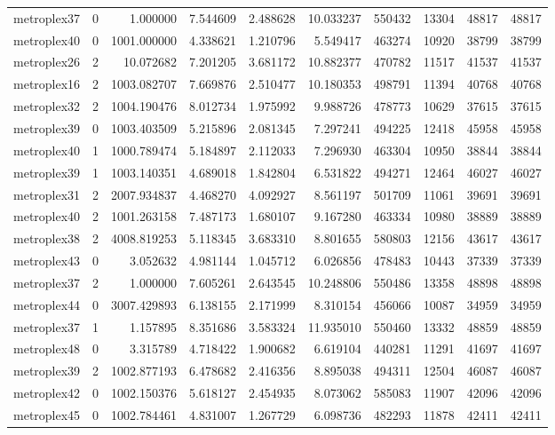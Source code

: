\begin{longtable}{|l|r|r|r|r|r|r|r|r|r|}
metroplex37 & 0 & 1.000000 & 7.544609 & 2.488628 & 10.033237 & 550432 & 13304 & 48817 & 48817 \\
metroplex40 & 0 & 1001.000000 & 4.338621 & 1.210796 & 5.549417 & 463274 & 10920 & 38799 & 38799 \\
metroplex26 & 2 & 10.072682 & 7.201205 & 3.681172 & 10.882377 & 470782 & 11517 & 41537 & 41537 \\
metroplex16 & 2 & 1003.082707 & 7.669876 & 2.510477 & 10.180353 & 498791 & 11394 & 40768 & 40768 \\
metroplex32 & 2 & 1004.190476 & 8.012734 & 1.975992 & 9.988726 & 478773 & 10629 & 37615 & 37615 \\
metroplex39 & 0 & 1003.403509 & 5.215896 & 2.081345 & 7.297241 & 494225 & 12418 & 45958 & 45958 \\
metroplex40 & 1 & 1000.789474 & 5.184897 & 2.112033 & 7.296930 & 463304 & 10950 & 38844 & 38844 \\
metroplex39 & 1 & 1003.140351 & 4.689018 & 1.842804 & 6.531822 & 494271 & 12464 & 46027 & 46027 \\
metroplex31 & 2 & 2007.934837 & 4.468270 & 4.092927 & 8.561197 & 501709 & 11061 & 39691 & 39691 \\
metroplex40 & 2 & 1001.263158 & 7.487173 & 1.680107 & 9.167280 & 463334 & 10980 & 38889 & 38889 \\
metroplex38 & 2 & 4008.819253 & 5.118345 & 3.683310 & 8.801655 & 580803 & 12156 & 43617 & 43617 \\
metroplex43 & 0 & 3.052632 & 4.981144 & 1.045712 & 6.026856 & 478483 & 10443 & 37339 & 37339 \\
metroplex37 & 2 & 1.000000 & 7.605261 & 2.643545 & 10.248806 & 550486 & 13358 & 48898 & 48898 \\
metroplex44 & 0 & 3007.429893 & 6.138155 & 2.171999 & 8.310154 & 456066 & 10087 & 34959 & 34959 \\
metroplex37 & 1 & 1.157895 & 8.351686 & 3.583324 & 11.935010 & 550460 & 13332 & 48859 & 48859 \\
metroplex48 & 0 & 3.315789 & 4.718422 & 1.900682 & 6.619104 & 440281 & 11291 & 41697 & 41697 \\
metroplex39 & 2 & 1002.877193 & 6.478682 & 2.416356 & 8.895038 & 494311 & 12504 & 46087 & 46087 \\
metroplex42 & 0 & 1002.150376 & 5.618127 & 2.454935 & 8.073062 & 585083 & 11907 & 42096 & 42096 \\
metroplex45 & 0 & 1002.784461 & 4.831007 & 1.267729 & 6.098736 & 482293 & 11878 & 42411 & 42411 \\

\end{longtable}

